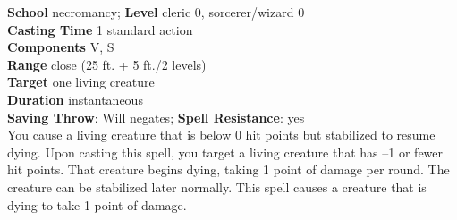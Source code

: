 \textbf{School }necromancy; \textbf{Level }cleric 0, sorcerer/wizard 0\\
\textbf{Casting Time }1 standard action\\
\textbf{Components }V, S\\
\textbf{Range }close (25 ft. + 5 ft./2 levels)\\
\textbf{Target} one living creature\\
\textbf{Duration }instantaneous\\
\textbf{Saving Throw}: Will negates; \textbf{Spell Resistance}: yes\\
You cause a living creature that is below 0 hit points but stabilized to resume dying. Upon casting this spell, you target a living creature that has –1 or fewer hit points. That creature begins dying, taking 1 point of damage per round. The creature can be stabilized later normally. This spell causes a creature that is dying to take 1 point of damage.\\
